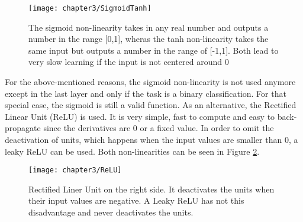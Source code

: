 \begin{figure}[H]
  \centering
  \caption{The sigmoid non-linearity takes in any real number and outputs a number in the range [0,1], wheras the tanh non-linearity takes the same input but outputs a number in the range of [-1,1]. Both lead to very slow learning if the input is not centered around 0 \cite{cs231neuralnetworks}}
  \texttt{[image: chapter3/SigmoidTanh]}
  \label{fig:SigmoidTanh}
\end{figure}

For the above-mentioned reasons, the sigmoid non-linearity is not used anymore except in the last layer and only if the task is a binary classification. For that special case, the sigmoid is still a valid function. As an alternative, the Rectified Linear Unit (ReLU) is used. It is very simple, fast to compute and easy to back-propagate since the derivatives are 0 or a fixed value. In order to omit the deactivation of units, which happens when the input values are smaller than 0, a leaky ReLU can be used. Both non-linearities can be seen in Figure \ref{fig:ReLU}.

\begin{figure}[H]
  \centering
  \caption{Rectified Liner Unit on the right side. It deactivates the units when their input values are negative. A Leaky ReLU has not this disadvantage and never deactivates the units. \cite{reinventingNN}}
  \texttt{[image: chapter3/ReLU]}
  \label{fig:ReLU}
\end{figure}

